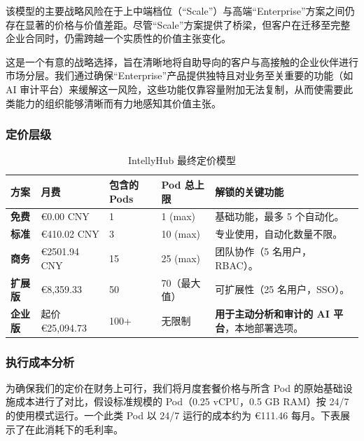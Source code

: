 \documentclass[11pt, a4paper, oneside]{article}
\begin{document}
该模型的主要战略风险在于上中端档位（“Scale”）与高端“Enterprise”方案之间仍存在显著的价格与价值差距。尽管“Scale”方案提供了桥梁，但客户在迁移至完整企业合同时，仍需跨越一个实质性的价值主张变化。

这是一个有意的战略选择，旨在清晰地将自助导向的客户与高接触的企业伙伴进行市场分层。我们通过确保“Enterprise”产品提供独特且对业务至关重要的功能（如 AI 审计平台）来缓解这一风险，这些功能仅靠容量附加无法复制，从而使需要此类能力的组织能够清晰而有力地感知其价值主张。

\subsubsection{定价层级}

\begin{table}[H]
\centering
\caption{IntellyHub 最终定价模型}
\label{tab:final_pricing_model}
\begin{tabularx}{\textwidth}{l L L L L} 
\toprule
\textbf{方案} & \textbf{月费} & \textbf{包含的 Pods} & \textbf{Pod 总上限} & \textbf{解锁的关键功能} \\
\midrule
\textbf{免费} & \euro{0.00 CNY} & 1 & 1 (max) & 基础功能，最多 5 个自动化。 \\
\addlinespace
\textbf{标准} & \euro{410.02 CNY} & 3 & 10 (max) & 专业使用，自动化数量不限。 \\
\addlinespace
\textbf{商务} & \euro{2501.94 CNY} & 15 & 25 (max) & 团队协作（5 名用户，RBAC）。 \\
\addlinespace



\textbf{扩展版} & \euro{8,359.33} & 50 & 70（最大值） & 可扩展性（25 名用户，SSO）。 \\
\addlinespace
\textbf{企业版} & 起价 \euro{25,094.73} & 100+ & 无限制 & \textbf{用于主动分析和审计的 AI 平台}，本地部署选项。 \\
\bottomrule
\end{tabularx}
\end{table}

\subsubsection{执行成本分析}

为确保我们的定价在财务上可行，我们将月度套餐价格与所含 Pod 的原始基础设施成本进行了对比，假设标准规模的 Pod（0.25 vCPU，0.5 GB RAM）按 24/7 的使用模式运行。一个此类 Pod 以 24/7 运行的成本约为 \euro{111.46 每月}。下表展示了在此消耗下的毛利率。
\end{document}
